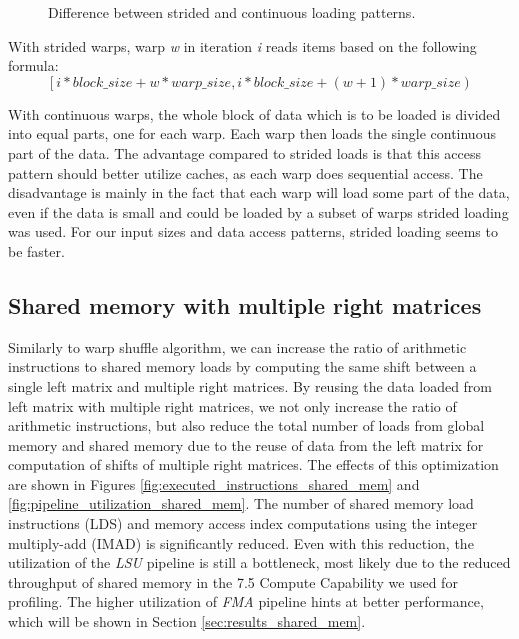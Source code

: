 \begin{figure}[ht]
	\centering
	\def\svgwidth{0.6\textwidth}
	
	\caption{Difference between strided and continuous loading patterns.}
	\label{fig:shared_memory_loading_patterns}
\end{figure}

With strided warps, warp \textit{w} in iteration \textit{i} reads items based on the following formula:
\[ \left[i * block\_size + w * warp\_size, i * block\_size + (w + 1) * warp\_size\right) \]

With continuous warps, the whole block of data which is to be loaded is divided into equal parts, one for each warp. Each warp then loads the single continuous part of the data. The advantage compared to strided loads is that this access pattern should better utilize caches, as each warp does sequential access. The disadvantage is mainly in the fact that each warp will load some part of the data, even if the data is small and could be loaded by a subset of warps strided loading was used. For our input sizes and data access patterns, strided loading seems to be faster. %

\subsection{Shared memory with multiple right matrices}

Similarly to warp shuffle algorithm, we can increase the ratio of arithmetic instructions to shared memory loads by computing the same shift between a single left matrix and multiple right matrices. By reusing the data loaded from left matrix with multiple right matrices, we not only increase the ratio of arithmetic instructions, but also reduce the total number of loads from global memory and shared memory due to the reuse of data from the left matrix for computation of shifts of multiple right matrices. The effects of this optimization are shown in Figures \ref{fig:executed_instructions_shared_mem} and \ref{fig:pipeline_utilization_shared_mem}. The number of shared memory load instructions (LDS) and memory access index computations using the integer multiply-add (IMAD) is significantly reduced. Even with this reduction, the utilization of the \textit{LSU} pipeline is still a bottleneck, most likely due to the reduced throughput of shared memory in the 7.5 Compute Capability we used for profiling. The higher utilization of \textit{FMA} pipeline hints at better performance, which will be shown in Section \ref{sec:results_shared_mem}.

